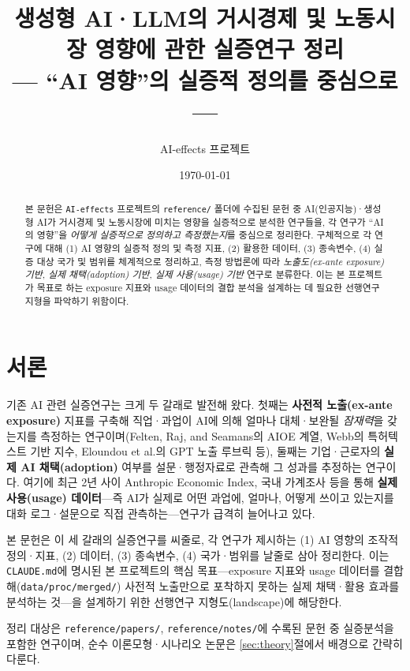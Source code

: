 \documentclass[11pt]{article}
\title{생성형 AI·LLM의 거시경제 및 노동시장 영향에 관한 실증연구 정리\\[2mm]
\large --- ``AI 영향''의 실증적 정의를 중심으로 ---}
\author{AI-effects 프로젝트}
\date{\today}
\begin{document}
\maketitle

\begin{abstract}
\noindent 본 문헌은 \texttt{AI-effects} 프로젝트의 \texttt{reference/} 폴더에 수집된 문헌 중 AI(인공지능)·생성형 AI가 거시경제 및 노동시장에 미치는 영향을 실증적으로 분석한 연구들을, 각 연구가 ``AI의 영향''을 \emph{어떻게 실증적으로 정의하고 측정했는지}를 중심으로 정리한다. 구체적으로 각 연구에 대해 (1) AI 영향의 실증적 정의 및 측정 지표, (2) 활용한 데이터, (3) 종속변수, (4) 실증 대상 국가 및 범위를 체계적으로 정리하고, 측정 방법론에 따라 \emph{노출도(ex-ante exposure) 기반}, \emph{실제 채택(adoption) 기반}, \emph{실제 사용(usage) 기반} 연구로 분류한다. 이는 본 프로젝트가 목표로 하는 exposure 지표와 usage 데이터의 결합 분석을 설계하는 데 필요한 선행연구 지형을 파악하기 위함이다.
\end{abstract}

\tableofcontents

\section{서론}

기존 AI 관련 실증연구는 크게 두 갈래로 발전해 왔다. 첫째는 \textbf{사전적 노출(ex-ante exposure)} 지표를 구축해 직업·과업이 AI에 의해 얼마나 대체·보완될 \emph{잠재력}을 갖는지를 측정하는 연구이며(Felten, Raj, and Seamans의 AIOE 계열, Webb의 특허텍스트 기반 지수, Eloundou et al.의 GPT 노출 루브릭 등), 둘째는 기업·근로자의 \textbf{실제 AI 채택(adoption)} 여부를 설문·행정자료로 관측해 그 성과를 추정하는 연구이다. 여기에 최근 2년 사이 Anthropic Economic Index, 국내 가계조사 등을 통해 \textbf{실제 사용(usage) 데이터}—즉 AI가 실제로 어떤 과업에, 얼마나, 어떻게 쓰이고 있는지를 대화 로그·설문으로 직접 관측하는—연구가 급격히 늘어나고 있다.

본 문헌은 이 세 갈래의 실증연구를 씨줄로, 각 연구가 제시하는 (1) AI 영향의 조작적 정의·지표, (2) 데이터, (3) 종속변수, (4) 국가·범위를 날줄로 삼아 정리한다. 이는 \texttt{CLAUDE.md}에 명시된 본 프로젝트의 핵심 목표—exposure 지표와 usage 데이터를 결합해(\texttt{data/proc/merged/}) 사전적 노출만으로 포착하지 못하는 실제 채택·활용 효과를 분석하는 것—을 설계하기 위한 선행연구 지형도(landscape)에 해당한다.

정리 대상은 \texttt{reference/papers/}, \texttt{reference/notes/}에 수록된 문헌 중 실증분석을 포함한 연구이며, 순수 이론모형·시나리오 논문은 \ref{sec:theory}절에서 배경으로 간략히 다룬다.
\end{document}
